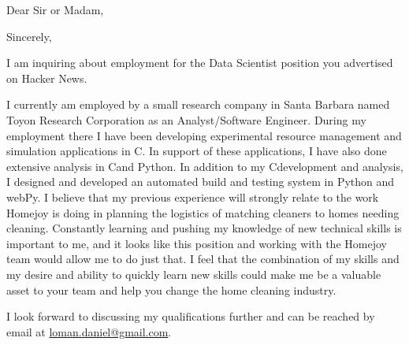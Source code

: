 \documentclass[11pt,letterpaper,sans]{moderncv}        %
\newcommand\cpp{C\raisebox{0.5ex}{\tiny\textbf{++}}}
\begin{document}
\date{July 12, 2014}
\opening{Dear Sir or Madam,}
\closing{Sincerely,}
\makelettertitle

I am inquiring about employment for the Data Scientist position you advertised on Hacker News.

I currently am employed by a small research company in Santa Barbara
named Toyon Research Corporation as an Analyst/Software Engineer.
During my employment there I have been developing experimental resource management and simulation applications in \cpp.
In support of these applications, I have also done extensive analysis in \cpp \space and Python.
In addition to my \cpp \space development and analysis, I designed and developed
an automated build and testing system in Python and webPy.
I believe that my previous experience will strongly relate to the work
Homejoy is doing in planning the logistics of matching cleaners to homes needing cleaning.
Constantly learning and pushing my knowledge of new technical skills is important to me,
and it looks like this position and working with the Homejoy team would allow me to do just that.
I feel that the combination of my skills and my desire and ability to quickly learn new skills
could make me be a valuable asset to your team and help you change the home cleaning industry.

I look forward to discussing my qualifications further and can be reached by email at
\href{loman.daniel@gmail.com}{\textcolor{color2}{loman.daniel@gmail.com}}.

\makeletterclosing
\end{document}
